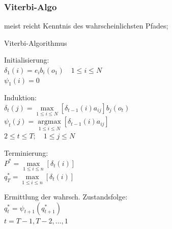 \documentclass[german,color,6pt]{latex4ei/latex4ei_sheet}
\begin{document}
\begin{sectionbox}
\subsubsection{Viterbi-Algo}
meist reicht Kenntnis des wahrscheinlichsten Pfades;
\begin{cookbox}{Viterbi-Algorithmus}
	\item Initialisierung: \\
		$\delta_1 (i) = e_i b_i (o_1) \quad 1 \leq i \leq N $\\
		$\psi _1 (i) = 0$\\
	\item Induktion: \\
		$\delta_t (j) = \max\limits_{1 \leq i \leq N }\left[ \delta_{t-1} (i) a_{ij} \right] b_j (o_t)$\\
		$\psi_t(j) = \underset{1 \leq i \leq N}{\operatorname{argmax}} \left[\delta_{t-1}(i) a_{ij} \right]$\\
		$2 \leq t \leq T; \quad 1 \leq j \leq N$\\
	\item Terminierung: \\
		$P^* = \max\limits_{1 \leq i \leq n} [\delta_t(i)]$\\
		$q_T^* = \max\limits_{1 \leq i \leq n} [\delta_t(i)]$\\
	\item Ermittlung der wahrsch. Zustandsfolge:\\
		$q_t^* = \psi_{t+1}(q^*_{t+1})$\\
		$t= T-1, T-2, \dots , 1$\\
\end{cookbox}
\end{sectionbox}







\end{document}
